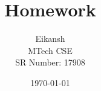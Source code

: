 \documentclass[11pt, letterpaper]{article}
\begin{document}
\title{Homework }
\author{Eikansh\\MTech CSE\\SR Number: 17908}
\date\today

\maketitle
\section*{}
\end{document}
